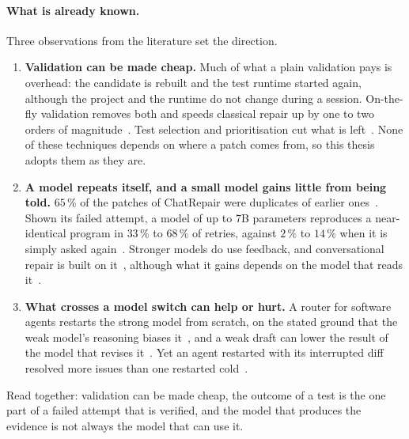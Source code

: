 \paragraph{What is already known.} Three observations from the literature set
the direction.
\begin{enumerate}
\item \textbf{Validation can be made cheap.} Much of what a plain validation
pays is overhead: the candidate is rebuilt and the test runtime started again,
although the project and the runtime do not change during a session.
On-the-fly validation removes both and speeds classical repair up by one to
two orders of magnitude~\citep{chen2021uniapr,xiao2024expressapr}. Test
selection and prioritisation cut what is left~\citep{lou2024aprregression,qi2013frtp,coles2016pit}.
None of these techniques depends on where a patch comes from, so this thesis
adopts them as they are.
\item \textbf{A model repeats itself, and a small model gains little from
being told.} $65\,\%$ of the patches of ChatRepair were duplicates of
earlier ones~\citep{chen2025conversational}. Shown its failed attempt, a model
of up to 7B parameters reproduces a near-identical program in $33\,\%$ to
$68\,\%$ of retries, against $2\,\%$ to $14\,\%$ when it is simply asked
again~\citep{verma2026blind}. Stronger models do use feedback, and
conversational repair is built on it~\citep{xia2024chatrepair}, although what
it gains depends on the model that reads it~\citep{olausson2024selfrepair}.
\item \textbf{What crosses a model switch can help or hurt.} A router for
software agents restarts the strong model from scratch, on the stated ground
that the weak model's reasoning biases it~\citep{son2026swerouter}, and a weak
draft can lower the result of the model that revises
it~\citep{ning2026revision}. Yet an agent restarted with its interrupted diff
resolved more issues than one restarted cold~\citep{wang2026failfast}.
\end{enumerate}
Read together: validation can be made cheap, the outcome of a test is the one
part of a failed attempt that is verified, and the model that produces the
evidence is not always the model that can use it.

